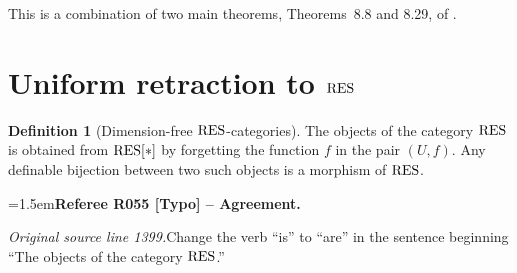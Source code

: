 \documentclass[12pt]{amsart}
\newcommand{\RefereeRemark}[4]{%
  \par\medskip\begingroup\normalfont\small\color{RefereePurple}%
  \emergencystretch=1.5em\noindent\textbf{Referee R#1 [#2] -- #3.}\par\nobreak\noindent #4\par
  \endgroup\medskip
}
\theoremstyle{plain}
\theoremstyle{definition}
\newtheorem{defn}[thm]{Definition}
\theoremstyle{remark}
\newtheorem{nota}[thm]{Notation}
\numberwithin{equation}{section}
\theoremstyle{plain}
\newcommand{\0}{\emptyset}
\newcommand{\sub}{\subseteq}
\newcommand{\RES}{\textup{RES}}
\begin{document}
This is a combination of two main theorems, Theorems~8.8 and 8.29, of \cite{hrushovski:kazhdan:integration:vf}.

\section{Uniform retraction to $\RES$}
\label{sec:retract}

\begin{defn}[Dimension-free $\RES$-categories]\label{df:res}
The objects of the category $\RES$ is obtained from $\RES[*]$ by forgetting the function $f$ in the pair $(U, f)$. Any definable bijection between two such objects is a morphism of $\RES$.

\RefereeRemark{055}{Typo}{Agreement}{%
\textit{Original source line 1399.}\quad Change the verb ``is'' to ``are'' in the sentence beginning ``The objects of the category $\RES$.''
}
\end{defn}

\end{document}
